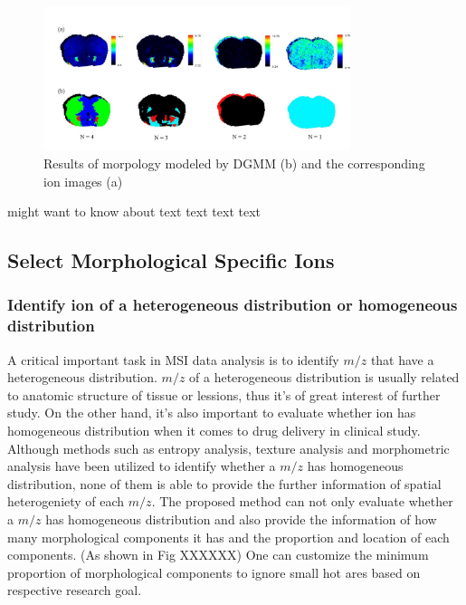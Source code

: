 \documentclass{bioinfo}
\begin{document}
\begin{figure}[b!]
    \centering
	\includegraphics[width=0.8\textwidth]{figure5.jpg}
    \caption{Results of morpology modeled by DGMM (b) and the corresponding ion images (a)}
    \label{fig:figure5}
\end{figure}
\citealp{Boffelli03} might want to know about text text text
text\vspace*{1pt}

\subsection{Select Morphological Specific Ions}
\subsubsection{Identify ion of a heterogeneous distribution or homogeneous distribution}
A critical important task in MSI data analysis is to identify $m/z$ that have a heterogeneous distribution. $m/z$ of a heterogeneous distribution is usually related to anatomic structure of tissue or lessions, thus it's of great interest of further study. On the other hand, it's also important to evaluate whether ion has homogeneous distribution when it comes to drug delivery in clinical study. Although methods such as entropy analysis, texture analysis and morphometric analysis have been utilized to identify whether a $m/z$ has homogeneous distribution, none of them is able to provide the further information of spatial heterogeniety of each $m/z$. The proposed method can not only evaluate whether  a $m/z$ has homogeneous distribution and also provide the information of how many morphological components it has and the proportion and location of each components. (As shown in Fig XXXXXX) One can customize the minimum proportion of morphological components to ignore small hot ares based on respective research goal.
\end{document}
